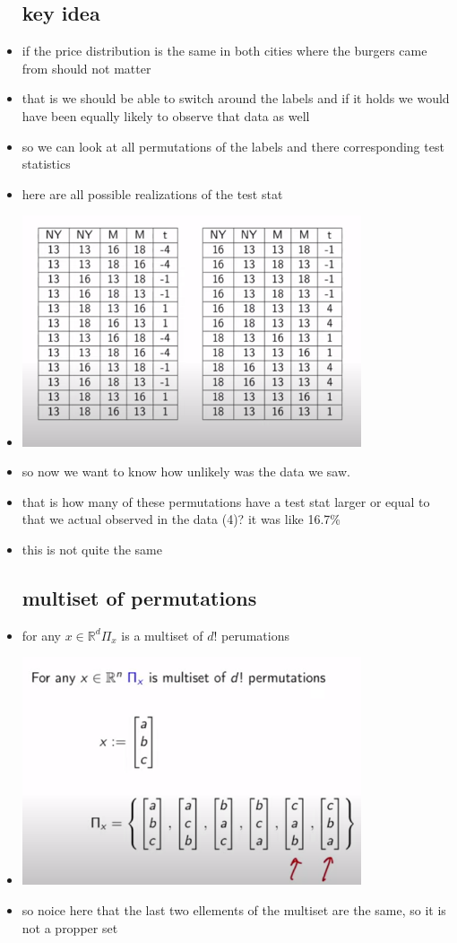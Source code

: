 \documentclass{article}
\begin{document}
\begin{itemize}
\subsection{key idea}
\item if the price distribution is the same in both cities where the burgers came from should not matter
\item that is we should be able to switch around the labels and if it holds we would have been 
equally likely to observe that data as well
\item so we can look at all permutations of the labels and there corresponding test statistics
\item here are all possible realizations of the test stat 
\item \includegraphics[width=10cm]{notes/week_7/vedio_1/immages/vedio-1-1.png}
\item so now we want to know how unlikely was the data we saw. 
\item that is how many of these permutations have a test stat larger or equal to that we actual observed in the data (4)? it was like 16.7\%
\item this is not quite the same 
\subsection{multiset of permutations}
\item for any $x\in \mathbb{R}^{d}\Pi_{x}$ is a multiset of $d!$ perumations
\item \includegraphics[width=10cm]{notes/week_7/vedio_1/immages/vedio-1-2.png}
\item so noice here that the last two ellements of the multiset are the same, so it is not a propper set 

\end{itemize}
\end{document}
